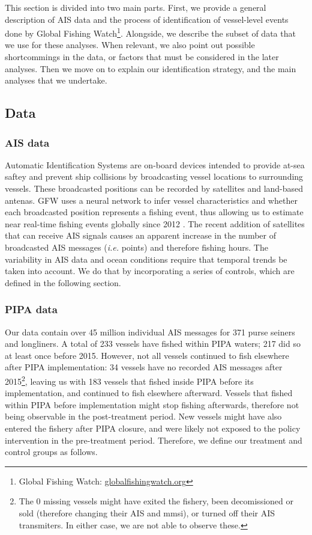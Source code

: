 \documentclass[12pt,]{article}
\let\rmarkdownfootnote\footnote%
\def\footnote{\protect\rmarkdownfootnote}
\begin{document}
This section is divided into two main parts. First, we provide a general
description of AIS data and the process of identification of
vessel-level events done by Global Fishing Watch\footnote{Global Fishing
  Watch: \url{globalfishingwatch.org}}. Alongside, we describe the
subset of data that we use for these analyses. When relevant, we also
point out possible shortcommings in the data, or factors that must be
considered in the later analyses. Then we move on to explain our
identification strategy, and the main analyses that we undertake.

\subsection{Data}\label{data}

\subsubsection{AIS data}\label{ais-data}

Automatic Identification Systems are on-board devices intended to
provide at-sea saftey and prevent ship collisions by broadcasting vessel
locations to surrounding vessels. These broadcasted positions can be
recorded by satellites and land-based antenas. GFW uses a neural network
to infer vessel characteristics and whether each broadcasted position
represents a fishing event, thus allowing us to estimate near real-time
fishing events globally since 2012 \citep{kroodsma_2018}. The recent
addition of satellites that can receive AIS signals causes an apparent
increase in the number of broadcasted AIS messages (\emph{i.e.} points)
and therefore fishing hours. The variability in AIS data and ocean
conditions require that temporal trends be taken into account. We do
that by incorporating a series of controls, which are defined in the
following section.

\subsubsection{PIPA data}\label{pipa-data}

Our data contain over 45 million individual AIS messages for 371 purse
seiners and longliners. A total of 233 vessels have fished within PIPA
waters; 217 did so at least once before 2015. However, not all vessels
continued to fish elsewhere after PIPA implementation: 34 vessels have
no recorded AIS messages after 2015\footnote{The 0 missing vessels might
  have exited the fishery, been decomissioned or sold (therefore
  changing their AIS and mmsi), or turned off their AIS transmiters. In
  either case, we are not able to observe these.}, leaving us with 183
vessels that fished inside PIPA before its implementation, and continued
to fish elsewhere afterward. Vessels that fished within PIPA before
implementation might stop fishing afterwards, therefore not being
observable in the post-treatment period. New vessels might have also
entered the fishery after PIPA closure, and were likely not exposed to
the policy intervention in the pre-treatment period. Therefore, we
define our treatment and control groups as follows.
\end{document}
